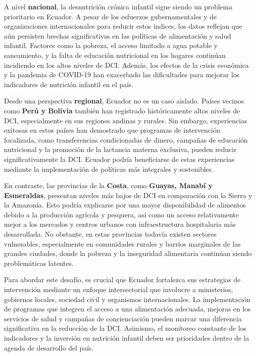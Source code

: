 \documentclass[
  letterpaper,
  DIV=11,
  numbers=noendperiod]{scrreprt}
\begin{document}
A nivel \textbf{nacional}, la desnutrición crónica infantil sigue siendo
un problema prioritario en Ecuador. A pesar de los esfuerzos
gubernamentales y de organizaciones internacionales para reducir estos
índices, los datos reflejan que aún persisten brechas significativas en
las políticas de alimentación y salud infantil. Factores como la
pobreza, el acceso limitado a agua potable y saneamiento, y la falta de
educación nutricional en los hogares continúan incidiendo en los altos
niveles de DCI. Además, los efectos de la crisis económica y la pandemia
de COVID-19 han exacerbado las dificultades para mejorar los indicadores
de nutrición infantil en el país.

Desde una perspectiva \textbf{regional}, Ecuador no es un caso aislado.
Países vecinos como \textbf{Perú y Bolivia} también han registrado
históricamente altos niveles de DCI, especialmente en sus regiones
andinas y rurales. Sin embargo, experiencias exitosas en estos países
han demostrado que programas de intervención focalizada, como
transferencias condicionadas de dinero, campañas de educación
nutricional y la promoción de la lactancia materna exclusiva, pueden
reducir significativamente la DCI. Ecuador podría beneficiarse de estas
experiencias mediante la implementación de políticas más integrales y
sostenibles.

En contraste, las provincias de la \textbf{Costa}, como \textbf{Guayas,
Manabí y Esmeraldas}, presentan niveles más bajos de DCI en comparación
con la Sierra y la Amazonía. Esto podría explicarse por una mayor
disponibilidad de alimentos debido a la producción agrícola y pesquera,
así como un acceso relativamente mejor a los mercados y centros urbanos
con infraestructura hospitalaria más desarrollada. No obstante, en estas
provincias todavía existen sectores vulnerables, especialmente en
comunidades rurales y barrios marginales de las grandes ciudades, donde
la pobreza y la inseguridad alimentaria continúan siendo problemáticas
latentes.

Para abordar este desafío, es crucial que Ecuador fortalezca sus
estrategias de intervención mediante un enfoque intersectorial que
involucre a ministerios, gobiernos locales, sociedad civil y organismos
internacionales. La implementación de programas que integren el acceso a
una alimentación adecuada, mejoras en los servicios de salud y campañas
de concienciación pueden marcar una diferencia significativa en la
reducción de la DCI. Asimismo, el monitoreo constante de los indicadores
y la inversión en nutrición infantil deben ser prioridades dentro de la
agenda de desarrollo del país.
\end{document}
